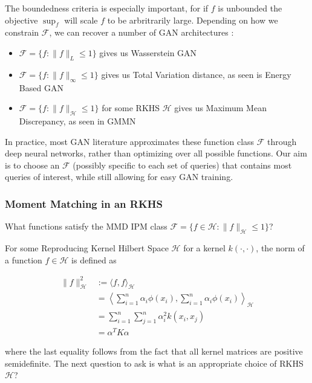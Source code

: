 \documentclass[]{article}
\newcommand{\F}{\mathcal{F}}
\theoremstyle{definition}
\begin{document}
The boundedness criteria is especially important, for if $f$ is unbounded the objective $\sup_f$ will scale $f$ to be arbritrarily large. Depending on how we constrain $\mathcal{F}$, we can recover a number of GAN architectures \cite{zotero-1283}: 

\begin{itemize}
    \item $\F = \{f: \|f\|_L \leq 1\}$ gives us Wasserstein GAN \cite{ACB17}
    \item $\F = \{f: \|f\|_\infty \leq 1 \}$ gives us Total Variation distance, as seen is Energy Based GAN \cite{ZML17}
    \item $\F = \{f: \|f\|_\mathcal{H} \leq 1 \}$ for some RKHS $\mathcal{H}$  gives us Maximum Mean Discrepancy, as seen in GMMN \cite{LSZ15a}
\end{itemize}

In practice, most GAN literature approximates these function class $\mathcal{F}$ through deep neural networks, rather than optimizing over all possible functions. Our aim is to choose an $\F$ (possibly specific to each set of queries) that contains most queries of interest, while still allowing for easy GAN training. 

\subsubsection{Moment Matching in an RKHS}

What functions satisfy the MMD IPM class  $\F = \{f \in \mathcal{H}: \|f\|_\mathcal{H} \leq 1 \}$? 

For some Reproducing Kernel Hilbert Space $\mathcal{H}$ for a kernel $k(\cdot,\cdot)$, the norm of a function $f \in \mathcal{H}$ is defined as 

\begin{align*}
    \| f \|^2_\mathcal{H} &:= \langle f, f \rangle _\mathcal{H}  \\
    &= \left \langle \sum_{i=1}^n \alpha_i \phi(x_i) , \sum_{i=1}^n \alpha_i \phi(x_i)   \right\rangle  _\mathcal{H} \\
    &= \sum_{i=1}^n \sum_{j=1}^n \alpha_i^2 k(x_i, x_j) \\
    &= \alpha^TK\alpha
\end{align*}

where the last equality follows from the fact that all kernel matrices are positive semidefinite. The next question to ask is what is an appropriate choice of RKHS $\mathcal{H}$? 
\end{document}
